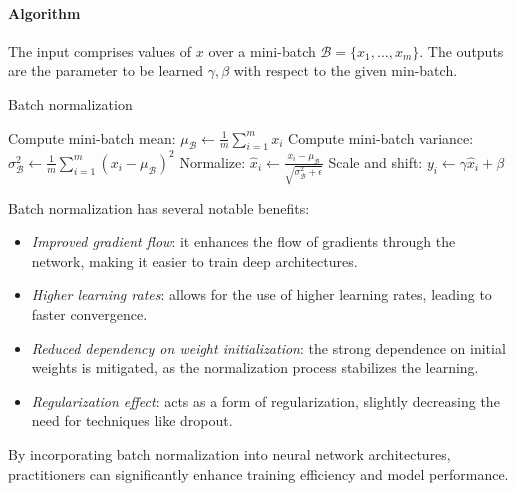 \paragraph*{Algorithm}
The input comprises values of $x$ over a mini-batch $\mathcal{B} = \{ x_1, \dots, x_m \}$. 
The outputs are the parameter to be learned $\gamma, \beta$ with respect to the given min-batch.
\begin{algorithm}
    \caption{Batch normalization}
    \begin{algorithmic}[1]
        \State Compute mini-batch mean: $\mu_{\mathcal{B}} \gets \frac{1}{m} \sum_{i=1}^m x_i$
        \State Compute mini-batch variance: $\sigma_{\mathcal{B}}^2 \gets \frac{1}{m} \sum_{i=1}^m (x_i - \mu_{\mathcal{B}})^2$
        \State Normalize: $\hat{x}_i \gets \frac{x_i - \mu_{\mathcal{B}}}{\sqrt{\sigma_{\mathcal{B}}^2 + \epsilon}}$     
        \State Scale and shift: $y_i \gets \gamma \hat{x}_i + \beta$
    \end{algorithmic}
\end{algorithm}
Batch normalization has several notable benefits:
\begin{itemize}
    \item \textit{Improved gradient flow}: it enhances the flow of gradients through the network, making it easier to train deep architectures.
    \item \textit{Higher learning rates}: allows for the use of higher learning rates, leading to faster convergence.
    \item \textit{Reduced dependency on weight initialization}: the strong dependence on initial weights is mitigated, as the normalization process stabilizes the learning.
    \item \textit{Regularization effect}: acts as a form of regularization, slightly decreasing the need for techniques like dropout.
\end{itemize}
By incorporating batch normalization into neural network architectures, practitioners can significantly enhance training efficiency and model performance.

